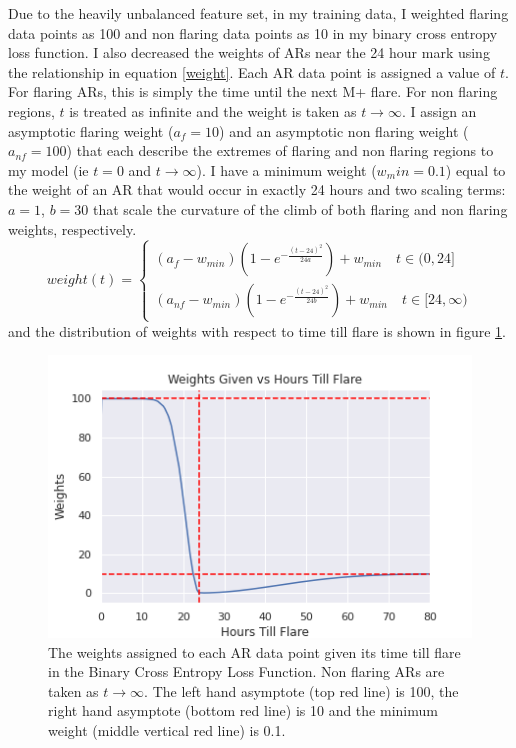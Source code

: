 \documentclass[defaultstyle,11pt]{thesis}
\begin{document}
Due to the heavily unbalanced feature set, in my training data, I weighted flaring data points as 100 and non flaring data points as 10 in my binary cross entropy loss function. I also decreased the weights of ARs near the 24 hour mark using the relationship in equation \ref{weight}. Each AR data point is assigned a value of $t$. For flaring ARs, this is simply the time until the next M+ flare. For non flaring regions, $t$ is treated as infinite and the weight is taken as $t \rightarrow \infty$. I assign an asymptotic flaring weight ($a_f = 10$) and an asymptotic non flaring weight ($a_{nf} = 100$) that each describe the extremes of flaring and non flaring regions to my model (ie $t = 0$ and $t \rightarrow \infty$). I have a minimum weight ($w_min = 0.1$) equal to the weight of an AR that would occur in exactly 24 hours and two scaling terms: $a = 1$, $b = 30$ that scale the curvature of the climb of both flaring and non flaring weights, respectively. 
\begin{equation}
    weight(t) = 
    \begin{cases}
        (a_f - w_{min})(1 - e^{-\frac{(t - 24)^2}{24a}}) + w_{min} \quad t \in (0, 24]\\
        (a_{nf} - w_{min})(1 - e^{-\frac{(t - 24)^2}{24b}}) + w_{min} \quad t \in [24, \infty)
    \end{cases}
    \label{weight}    
\end{equation}
and the distribution of weights with respect to time till flare is shown in figure \ref{fig:weights}.
\begin{figure}[h]
    \centering
    \includegraphics[width=0.5\linewidth]{ThesisFilePkg/figures/methods/weights.png}
    \caption{The weights assigned to each AR data point given its time till flare in the Binary Cross Entropy Loss Function. Non flaring ARs are taken as $t \rightarrow \infty$. The left hand asymptote (top red line) is 100, the right hand asymptote (bottom red line) is 10 and the minimum weight (middle vertical red line) is 0.1.}
    \label{fig:weights}
\end{figure}
\end{document}
